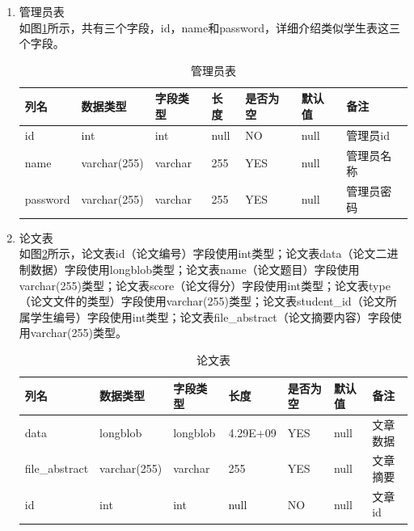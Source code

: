 \begin{enumerate}
\begin{table}[H]
          \end{table}
    \item 管理员表\\
          如图\ref{db-admin}所示，共有三个字段，id，name和password，详细介绍类似学生表这三个字段。
          \begin{table}[H]
              \centering
              \song\wuhao
              \caption{管理员表}
              \label{db-admin}
              \begin{tabular}{|l|l|l|l|l|l|l|}
                  \hline
                  列名     & 数据类型     & 字段类型 & 长度 & 是否为空 & 默认值 & 备注       \\ \hline
                  id       & int          & int      & null & NO       & null   & 管理员id   \\ \hline
                  name     & varchar(255) & varchar  & 255  & YES      & null   & 管理员名称 \\ \hline
                  password & varchar(255) & varchar  & 255  & YES      & null   & 管理员密码 \\ \hline
              \end{tabular}
          \end{table}
    \item 论文表\\
          如图\ref{db-file}所示，论文表id（论文编号）字段使用int类型；论文表data（论文二进制数据）字段使用longblob类型；论文表name（论文题目）字段使用varchar(255)类型；论文表score（论文得分）字段使用int类型；论文表type（论文文件的类型）字段使用varchar(255)类型；论文表student\_id（论文所属学生编号）字段使用int类型；论文表file\_abstract（论文摘要内容）字段使用varchar(255)类型。
          \begin{table}[H]
              \centering
              \song\wuhao
              \caption{论文表}
              \label{db-file}
              \begin{tabular}{|l|l|l|l|l|l|l|}
                  \hline
                  列名           & 数据类型     & 字段类型 & 长度     & 是否为空 & 默认值 & 备注             \\ \hline
                  data           & longblob     & longblob & 4.29E+09 & YES      & null   & 文章数据         \\ \hline
                  file\_abstract & varchar(255) & varchar  & 255      & YES      & null   & 文章摘要         \\ \hline
                  id             & int          & int      & null     & NO       & null   & 文章id           \\ \hline

\end{tabular}
\end{table}
\end{enumerate}
